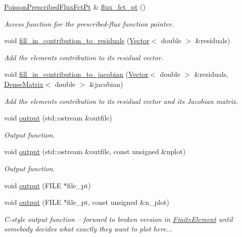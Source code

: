 \begin{DoxyCompactItemize}
\hyperlink{classoomph_1_1PoissonFluxElement_a667254e1d7fea39ba393e0d9853f216d}{Poisson\+Prescribed\+Flux\+Fct\+Pt} \& \hyperlink{classoomph_1_1PoissonFluxElement_a95afd87915bf4c678d4304cab9daa219}{flux\+\_\+fct\+\_\+pt} ()
\begin{DoxyCompactList}\small\item\em Access function for the prescribed-\/flux function pointer. \end{DoxyCompactList}\item 
void \hyperlink{classoomph_1_1PoissonFluxElement_aca66501e8cbbf029660e45819f3ba7d8}{fill\+\_\+in\+\_\+contribution\+\_\+to\+\_\+residuals} (\hyperlink{classoomph_1_1Vector}{Vector}$<$ double $>$ \&residuals)
\begin{DoxyCompactList}\small\item\em Add the element\textquotesingle{}s contribution to its residual vector. \end{DoxyCompactList}\item 
void \hyperlink{classoomph_1_1PoissonFluxElement_a7be7daf3b3b3ba50a216d40d1d8016f5}{fill\+\_\+in\+\_\+contribution\+\_\+to\+\_\+jacobian} (\hyperlink{classoomph_1_1Vector}{Vector}$<$ double $>$ \&residuals, \hyperlink{classoomph_1_1DenseMatrix}{Dense\+Matrix}$<$ double $>$ \&jacobian)
\begin{DoxyCompactList}\small\item\em Add the element\textquotesingle{}s contribution to its residual vector and its Jacobian matrix. \end{DoxyCompactList}\item 
void \hyperlink{classoomph_1_1PoissonFluxElement_ab8b5786144b8fed902bd7c47754675ba}{output} (std\+::ostream \&outfile)
\begin{DoxyCompactList}\small\item\em Output function. \end{DoxyCompactList}\item 
void \hyperlink{classoomph_1_1PoissonFluxElement_a81b328ed2127556fa9e5b948d94aca97}{output} (std\+::ostream \&outfile, const unsigned \&nplot)
\begin{DoxyCompactList}\small\item\em Output function. \end{DoxyCompactList}\item 
void \hyperlink{classoomph_1_1PoissonFluxElement_a06e4e314f0173f14d804dfa653194570}{output} (F\+I\+LE $\ast$file\+\_\+pt)
\item 
void \hyperlink{classoomph_1_1PoissonFluxElement_acef72a7460036c88ba254d58e26bc820}{output} (F\+I\+LE $\ast$file\+\_\+pt, const unsigned \&n\+\_\+plot)
\begin{DoxyCompactList}\small\item\em C-\/style output function -- forward to broken version in \hyperlink{classoomph_1_1FiniteElement}{Finite\+Element} until somebody decides what exactly they want to plot here... \end{DoxyCompactList}\end{DoxyCompactItemize}

